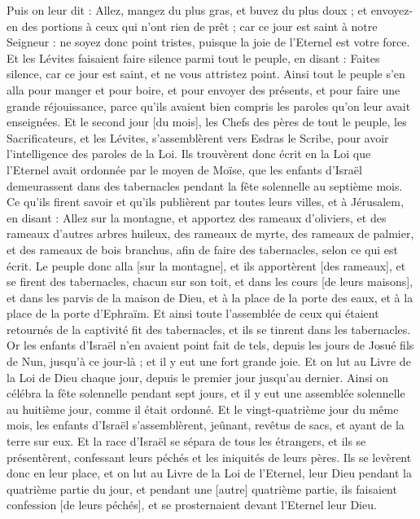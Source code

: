 \begin{multicols}{2}
{Puis on leur dit : Allez, mangez du plus gras, et buvez du plus doux ; et envoyez-en des portions à ceux qui n'ont rien de prêt ; car ce jour est saint à notre Seigneur : ne soyez donc point tristes, puisque la joie de l'Eternel est votre force.
Et les Lévites faisaient faire silence parmi tout le peuple, en disant : Faites silence, car ce jour est saint, et ne vous attristez point.
Ainsi tout le peuple s'en alla pour manger et pour boire, et pour envoyer des présents, et pour faire une grande réjouissance, parce qu'ils avaient bien compris les paroles qu'on leur avait enseignées.
Et le second jour [du mois], les Chefs des pères de tout le peuple, les Sacrificateurs, et les Lévites, s'assemblèrent vers Esdras le Scribe, pour avoir l'intelligence des paroles de la Loi.
Ils trouvèrent donc écrit en la Loi que l'Eternel avait ordonnée par le moyen de Moïse, que les enfants d'Israël demeurassent dans des tabernacles pendant la fête solennelle au septième mois.
Ce qu'ils firent savoir et qu'ils publièrent par toutes leurs villes, et à Jérusalem, en disant : Allez sur la montagne, et apportez des rameaux d'oliviers, et des rameaux d'autres arbres huileux, des rameaux de myrte, des rameaux de palmier, et des rameaux de bois branchus, afin de faire des tabernacles, selon ce qui est écrit.
Le peuple donc alla [sur la montagne], et ils apportèrent [des rameaux], et se firent des tabernacles, chacun sur son toit, et dans les cours [de leurs maisons], et dans les parvis de la maison de Dieu, et à la place de la porte des eaux, et à la place de la porte d'Ephraïm.
Et ainsi toute l'assemblée de ceux qui étaient retournés de la captivité fit des tabernacles, et ils se tinrent dans les tabernacles. Or les enfants d'Israël n'en avaient point fait de tels, depuis les jours de Josué fils de Nun, jusqu'à ce jour-là ; et il y eut une fort grande joie.
Et on lut au Livre de la Loi de Dieu chaque jour, depuis le premier jour jusqu'au dernier. Ainsi on célébra la fête solennelle pendant sept jours, et il y eut une assemblée solennelle au huitième jour, comme il était ordonné.
\VerseOne{}Et le vingt-quatrième jour du même mois, les enfants d'Israël s'assemblèrent, jeûnant, revêtus de sacs, et ayant de la terre sur eux.
Et la race d'Israël se sépara de tous les étrangers, et ils se présentèrent, confessant leurs péchés et les iniquités de leurs pères.
Ils se levèrent donc en leur place, et on lut au Livre de la Loi de l'Eternel, leur Dieu pendant la quatrième partie du jour, et pendant une [autre] quatrième partie, ils faisaient confession [de leurs péchés], et se prosternaient devant l'Eternel leur Dieu.
}
\end{multicols}
